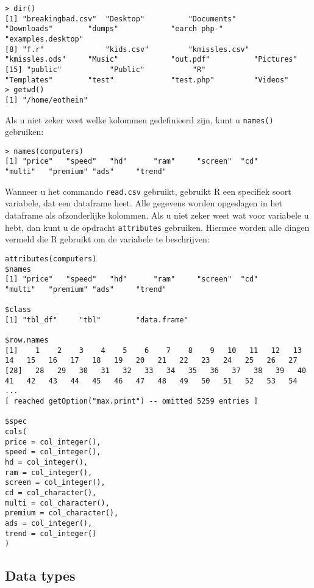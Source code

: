 \begin{lstlisting}
> dir()
[1] "breakingbad.csv"  "Desktop"          "Documents"        "Downloads"        "dumps"            "earch php-"       "examples.desktop"
[8] "f.r"              "kids.csv"         "kmissles.csv"     "kmissles.ods"     "Music"            "out.pdf"          "Pictures"        
[15] "public"           "Public"           "R"                "Templates"        "test"             "test.php"         "Videos"          
> getwd()
[1] "/home/eothein"
\end{lstlisting}

Als u niet zeker weet welke kolommen gedefinieerd zijn, kunt u \texttt{names()} gebruiken:

\begin{lstlisting}
> names(computers)
[1] "price"   "speed"   "hd"      "ram"     "screen"  "cd"      "multi"   "premium" "ads"     "trend"
\end{lstlisting}

Wanneer u het commando \texttt{read.csv} gebruikt, gebruikt R een specifiek soort variabele, dat een dataframe heet. Alle gegevens worden opgeslagen in het dataframe als afzonderlijke kolommen. Als u niet zeker weet wat voor variabele u hebt, dan kunt u de opdracht \texttt{attributes} gebruiken. Hiermee worden alle dingen vermeld die R gebruikt om de variabele te beschrijven:

\begin{lstlisting}
attributes(computers)
$names
[1] "price"   "speed"   "hd"      "ram"     "screen"  "cd"      "multi"   "premium" "ads"     "trend"  

$class
[1] "tbl_df"     "tbl"        "data.frame"

$row.names
[1]    1    2    3    4    5    6    7    8    9   10   11   12   13   14   15   16   17   18   19   20   21   22   23   24   25   26   27
[28]   28   29   30   31   32   33   34   35   36   37   38   39   40   41   42   43   44   45   46   47   48   49   50   51   52   53   54
...
[ reached getOption("max.print") -- omitted 5259 entries ]

$spec
cols(
price = col_integer(),
speed = col_integer(),
hd = col_integer(),
ram = col_integer(),
screen = col_integer(),
cd = col_character(),
multi = col_character(),
premium = col_character(),
ads = col_integer(),
trend = col_integer()
)

\end{lstlisting}

\subsection{Data types}

